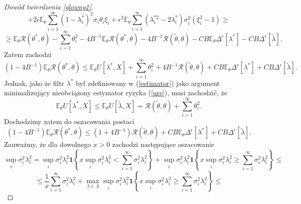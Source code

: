 \documentclass{mwart}
\begin{document}
\begin{proof}[Dowód twierdzenia \ref{glowny1}]
\begin{displaymath}
\end{displaymath}
\begin{displaymath}
+2\epsilon\mathbb{E}_{\theta}\sum_{i=1}^{\infty}(1-\lambda_i^*)^2\sigma_i\theta_i\xi_i+\epsilon^2\mathbb{E}_{\theta}\sum_{i=1}^{\infty}(\lambda_i^{*2}-2\lambda_i^*)\sigma_i^2(\xi_i^2-1)\geq
\end{displaymath}
\begin{displaymath}
\geq \mathbb{E}_{\theta}\mathcal{R}(\theta^*,\theta)-\sum_{i=1}^{\infty}\theta_i^2-4B^{-1}\mathbb{E}_{\theta}\mathcal{R}(\theta^*,\theta)-4B^{-1}\mathcal{R}(\tilde{\theta},\theta)-CB\mathbb{E}_{\theta}\Delta^{\epsilon}[\lambda^*]-CB\Delta^{\epsilon}[\tilde{\lambda}].
\end{displaymath}
Zatem zachodzi
\begin{displaymath}
(1-4B^{-1})\mathbb{E}_{\theta}\mathcal{R}(\theta^*,\theta)\leq \mathbb{E}_{\theta}U[\lambda^*,X]+\sum_{i=1}^{\infty}\theta_i^2+4B^{-1}\mathcal{R}(\tilde{\theta},\theta)+CB\mathbb{E}_{\theta}\Delta^{\epsilon}[\lambda^*]+CB\Delta^{\epsilon}[\tilde{\lambda}].
\end{displaymath}
Jednak, jako że filtr $\lambda^*$ był zdefiniowany w (\ref{estimator}) jako argument minimalizujący nieobciążony estymator ryzyka (\ref{ure}), musi zachodzić, że
\begin{displaymath}
\mathbb{E}_{\theta}U[\lambda^*,X]\leq \mathbb{E}_{\theta}U[\tilde{\lambda},X]=\mathcal{R}(\tilde{\theta},\theta)+\sum_{i=1}^{\infty}\theta_i^2.
\end{displaymath}
Dochodzimy zatem do oszacowania postaci 
\begin{equation}\label{szacowanie4}
(1-4B^{-1})\mathbb{E}_{\theta}\mathcal{R}(\theta^*,\theta)\leq (1+4B^{-1})\mathcal{R}(\tilde{\theta},\theta)+CB\mathbb{E}_{\theta}\Delta^{\epsilon}[\lambda^*]+CB\Delta^{\epsilon}[\tilde{\lambda}].
\end{equation}
Zauważmy, że dla dowolnego $x>0$ zachodzi następujące oszacowanie
\begin{displaymath}
\sup_i\sigma_i^2\lambda_i^2=\sup_i\sigma_i^2\lambda_i^2\pmb{1}\left\{x\sup_i\sigma_i^2\lambda_i^2<\sum_{i=1}^{\infty}\sigma_i^2\lambda_i^2\right\}+\sup_i\sigma_i^2\lambda_i^2\pmb{1}\left\{x\sup_i\sigma_i^2\lambda_i^2\geq \sum_{i=1}^{\infty}\sigma_i^2\lambda_i^2\right\}\leq
\end{displaymath}
\begin{displaymath}
\leq \frac{1}{x}\sum_{i=1}^{\infty}\sigma_i^2\lambda_i^2+\max_{\lambda\in \Lambda}\sup_i\sigma_i^2\lambda_i^2\pmb{1}\left\{x\sup_i\sigma_i^2\lambda_i^2\geq \sum_{i=1}^{\infty}\sigma_i^2\lambda_i^2\right\}\leq

\end{displaymath}
\end{proof}
\end{document}
